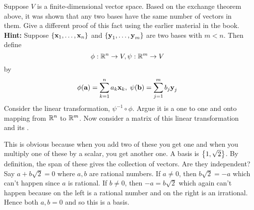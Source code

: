 \begin{ex}
  Suppose $V$ is a finite-dimensional vector space. Based on the
  exchange theorem above, it was shown that any two bases have the same number
  of vectors in them. Give a different proof of this fact using the earlier
  material in the book. \textbf{Hint: }Suppose $\left\{\mbox{\bf x}_1
    ,\ldots,\mbox{\bf x}_{n}\right\} $ and $\left\{\mbox{\bf y}_1,\ldots,\mbox{\bf y}
    _{m}\right\} $ are two bases with $m<n$. Then define
  \begin{equation*}
    \phi :\mathbb{R}^{n}\to V,\psi :\mathbb{R}^{m}\to V
  \end{equation*}
  by
  \begin{equation*}
    \phi (\mbox{\bf a}) = \sum_{k=1}^{n}a_{k}\mbox{\bf x}
    _{k},\;\psi (\mbox{\bf b}) = \sum_{j=1}^{m}b_{j}\mbox{\bf y}_{j}
  \end{equation*}
  Consider the linear transformation, $\psi ^{-1}\circ \phi$. Argue it is a
  one to one and onto mapping from $\mathbb{R}^{n}$ to $\mathbb{R}^{m}$. Now
  consider a matrix of this linear transformation and its {\rref}.
  \begin{sol}
    This is obvious because
    when you add two of these you get one and when you multiply one of these by
    a scalar, you get another one. A basis is $\left\{1,\sqrt{2}\right\}$. By
    definition, the span of these gives the collection of vectors. Are they
    independent? Say $a+b\sqrt{2}=0$ where $a,b$ are rational numbers. If $a\neq
    0$, then $b\sqrt{2}=-a$ which can't happen since $a$ is rational. If $b\neq
    0$, then $-a=b\sqrt{2}$ which again can't happen because on the left is a
    rational number and on the right is an irrational. Hence both $a,b=0$ and so
    this is a basis.
  \end{sol}
\end{ex}

